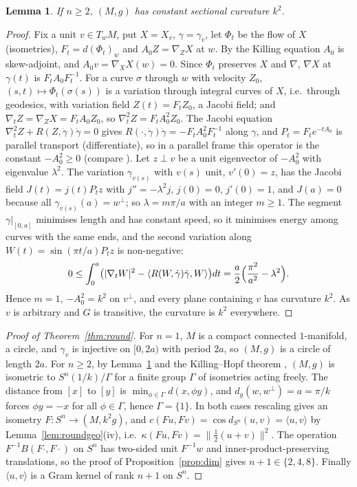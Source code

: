 \documentclass[11pt,reqno]{amsart}
\newtheorem{lemma}[theorem]{Lemma}
\theoremstyle{definition}
\theoremstyle{remark}
\numberwithin{equation}{section}
\newcommand{\ip}[2]{\langle #1,#2\rangle}
\begin{document}
\begin{lemma}\label{lem:roundcurv}
If $n\ge2$, $(M,g)$ has constant sectional curvature $k^2$.
\end{lemma}
\begin{proof}
Fix a unit $v\in T_wM$, put $X=X_v$, $\gamma=\gamma_v$, let $\Phi_t$ be the flow of $X$ (isometries), $F_t=d(\Phi_t)_w$ and $A_0Z=\nabla_ZX$ at $w$.  By
the Killing equation $A_0$ is skew-adjoint, and $A_0v=\nabla_XX(w)=0$.  Since $\Phi_t$ preserves $X$ and $\nabla$, $\nabla X$ at $\gamma(t)$ is $F_tA_0F_t^{-1}$.
For a curve $\sigma$ through $w$ with velocity $Z_0$, $(s,t)\mapsto\Phi_t(\sigma(s))$ is a variation through integral curves of $X$, i.e.\ through
geodesics, with variation field $Z(t)=F_tZ_0$, a Jacobi field; and $\nabla_tZ=\nabla_ZX=F_tA_0Z_0$, so $\nabla_t^2Z=F_tA_0^2Z_0$.  The Jacobi equation
$\nabla_t^2Z+R(Z,\dot\gamma)\dot\gamma=0$ gives $R(\cdot,\dot\gamma)\dot\gamma=-F_tA_0^2F_t^{-1}$ along $\gamma$, and $P_t=F_te^{-tA_0}$ is parallel transport
(differentiate), so in a parallel frame this operator is the constant $-A_0^2\ge0$ (compare \cite[Prop.~1, Thm.~5]{BN09}).  Let $z\perp v$ be a unit
eigenvector of $-A_0^2$ with eigenvalue $\lambda^2$.  The variation $\gamma_{v(s)}$ with $v(s)$ unit, $v'(0)=z$, has the Jacobi field $J(t)=j(t)P_tz$
with $j''=-\lambda^2j$, $j(0)=0$, $j'(0)=1$, and $J(a)=0$ because all $\gamma_{v(s)}(a)=w^\perp$; so $\lambda=m\pi/a$ with an integer $m\ge1$.  The
segment $\gamma|_{[0,a]}$ minimises length and has constant speed, so it minimises energy among curves with the same ends, and the second
variation \cite[Ch.~10]{Lee18} along $W(t)=\sin(\pi t/a)P_tz$ is non-negative:
\[
0\le\int_0^a\bigl(\lvert\nabla_tW\rvert^2-\langle R(W,\dot\gamma)\dot\gamma,W\rangle\bigr)dt=\frac a2\Bigl(\frac{\pi^2}{a^2}-\lambda^2\Bigr).
\]
Hence $m=1$, $-A_0^2=k^2$ on $v^\perp$, and every plane containing $v$ has curvature $k^2$.  As $v$ is arbitrary and $G$ is transitive, the
curvature is $k^2$ everywhere.
\end{proof}

\begin{proof}[Proof of Theorem~\ref{thm:round}]
For $n=1$, $M$ is a compact connected $1$-manifold, a circle, and $\gamma_v$ is injective on $[0,2a)$ with period $2a$, so $(M,g)$ is a
circle of length $2a$.  For $n\ge2$, by Lemma~\ref{lem:roundcurv} and the Killing--Hopf theorem \cite[Ch.~12]{Lee18}, $(M,g)$ is
isometric to $S^n(1/k)/\Gamma$ for a finite group $\Gamma$ of isometries acting freely.  The distance from $[x]$ to $[y]$ is $\min_{\phi\in\Gamma}d(x,\phi y)$,
and $d_g(w,w^\perp)=a=\pi/k$ forces $\phi y=-x$ for all $\phi\in\Gamma$, hence $\Gamma=\{1\}$.  In both cases rescaling gives an isometry
$F\colon S^n\to(M,k^2g)$, and $c(Fu,Fv)=\cos d_{S^n}(u,v)=\ip uv$ by Lemma~\ref{lem:roundgeo}(iv), i.e.\ $\kappa(Fu,Fv)=\lVert\frac12(u+v)\rVert^2$.
The operation $F^{-1}B(F\cdot,F\cdot)$ on $S^n$ has two-sided unit $F^{-1}w$ and inner-product-preserving translations, so the proof of
Proposition~\ref{prop:dim} gives $n+1\in\{2,4,8\}$.  Finally $\ip uv$ is a Gram kernel of rank $n+1$ on $S^n$.
\end{proof}
\end{document}
